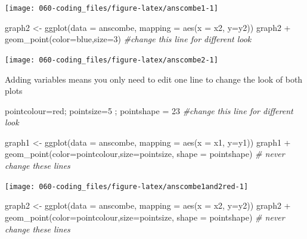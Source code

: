 \documentclass[
  12pt,
  a5paper,
]{book}
\newenvironment{Shaded}{\begin{snugshade}}{\end{snugshade}}
\newcommand{\AttributeTok}[1]{\textcolor[rgb]{0.77,0.63,0.00}{#1}}
\newcommand{\CommentTok}[1]{\textcolor[rgb]{0.56,0.35,0.01}{\textit{#1}}}
\newcommand{\DecValTok}[1]{\textcolor[rgb]{0.00,0.00,0.81}{#1}}
\newcommand{\FunctionTok}[1]{\textcolor[rgb]{0.00,0.00,0.00}{#1}}
\newcommand{\NormalTok}[1]{#1}
\newcommand{\OtherTok}[1]{\textcolor[rgb]{0.56,0.35,0.01}{#1}}
\newcommand{\SpecialCharTok}[1]{\textcolor[rgb]{0.00,0.00,0.00}{#1}}
\newcommand{\StringTok}[1]{\textcolor[rgb]{0.31,0.60,0.02}{#1}}
\begin{document}
\begin{center}\texttt{[image: 060-coding\_files/figure-latex/anscombe1-1]} \end{center}

\begin{Shaded}
\begin{Highlighting}[]
\NormalTok{graph2 }\OtherTok{\textless{}{-}} \FunctionTok{ggplot}\NormalTok{(}\AttributeTok{data =}\NormalTok{ anscombe, }\AttributeTok{mapping =} \FunctionTok{aes}\NormalTok{(}\AttributeTok{x =}\NormalTok{ x2, }\AttributeTok{y=}\NormalTok{y2))}
\NormalTok{graph2 }\SpecialCharTok{+} \FunctionTok{geom\_point}\NormalTok{(}\AttributeTok{color=}\StringTok{\textquotesingle{}blue\textquotesingle{}}\NormalTok{,}\AttributeTok{size=}\DecValTok{3}\NormalTok{) }\CommentTok{\#change this line for different look}
\end{Highlighting}
\end{Shaded}

\begin{center}\texttt{[image: 060-coding\_files/figure-latex/anscombe2-1]} \end{center}

Adding variables means you only need to edit one line to change the look of both plots

\begin{Shaded}
\begin{Highlighting}[]
\NormalTok{pointcolour}\OtherTok{=}\StringTok{\textquotesingle{}red\textquotesingle{}}\NormalTok{; pointsize}\OtherTok{=}\DecValTok{5}\NormalTok{ ; pointshape }\OtherTok{=} \DecValTok{23} \CommentTok{\#change this line for different look}

\NormalTok{graph1 }\OtherTok{\textless{}{-}} \FunctionTok{ggplot}\NormalTok{(}\AttributeTok{data =}\NormalTok{ anscombe, }\AttributeTok{mapping =} \FunctionTok{aes}\NormalTok{(}\AttributeTok{x =}\NormalTok{ x1, }\AttributeTok{y=}\NormalTok{y1)) }
\NormalTok{graph1 }\SpecialCharTok{+} \FunctionTok{geom\_point}\NormalTok{(}\AttributeTok{color=}\NormalTok{pointcolour,}\AttributeTok{size=}\NormalTok{pointsize, }\AttributeTok{shape =}\NormalTok{ pointshape) }\CommentTok{\# never change these lines}
\end{Highlighting}
\end{Shaded}

\begin{center}\texttt{[image: 060-coding\_files/figure-latex/anscombe1and2red-1]} \end{center}

\begin{Shaded}
\begin{Highlighting}[]
\NormalTok{graph2 }\OtherTok{\textless{}{-}} \FunctionTok{ggplot}\NormalTok{(}\AttributeTok{data =}\NormalTok{ anscombe, }\AttributeTok{mapping =} \FunctionTok{aes}\NormalTok{(}\AttributeTok{x =}\NormalTok{ x2, }\AttributeTok{y=}\NormalTok{y2))}
\NormalTok{graph2 }\SpecialCharTok{+} \FunctionTok{geom\_point}\NormalTok{(}\AttributeTok{color=}\NormalTok{pointcolour,}\AttributeTok{size=}\NormalTok{pointsize, }\AttributeTok{shape =}\NormalTok{ pointshape) }\CommentTok{\# never change these lines}
\end{Highlighting}
\end{Shaded}
\end{document}
